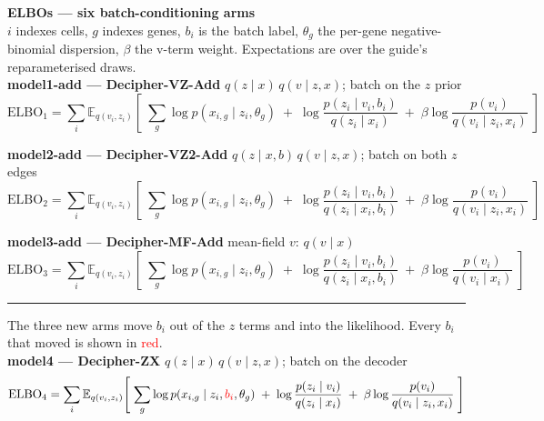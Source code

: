 \documentclass[12pt]{article}
\newcommand{\ELBO}[1]{\mathrm{ELBO}_{#1}}
\begin{document}
\textbf{\large ELBOs --- six batch-conditioning arms}\\[2pt]
{\small $i$ indexes cells, $g$ indexes genes, $b_i$ is the batch label,
$\theta_g$ the per-gene negative-binomial dispersion, $\beta$ the v-term weight.
Expectations are over the guide's reparameterised draws.}\\[10pt]

\textbf{model1-add \;---\; Decipher-VZ-Add} \hfill {\small $q(z\mid x)\,q(v\mid z,x)$; batch on the $z$ prior}
\begin{equation*}
\ELBO{1} = \sum_i \mathbb{E}_{q(v_i,z_i)}\!\left[\;
\sum_g \log p(x_{i,g}\mid z_i,\theta_g)
\;+\; \log\frac{p(z_i\mid v_i,b_i)}{q(z_i\mid x_i)}
\;+\; \beta\log\frac{p(v_i)}{q(v_i\mid z_i,x_i)}
\;\right]
\end{equation*}

\vspace{4pt}
\textbf{model2-add \;---\; Decipher-VZ2-Add} \hfill {\small $q(z\mid x,b)\,q(v\mid z,x)$; batch on both $z$ edges}
\begin{equation*}
\ELBO{2} = \sum_i \mathbb{E}_{q(v_i,z_i)}\!\left[\;
\sum_g \log p(x_{i,g}\mid z_i,\theta_g)
\;+\; \log\frac{p(z_i\mid v_i,b_i)}{q(z_i\mid x_i,b_i)}
\;+\; \beta\log\frac{p(v_i)}{q(v_i\mid z_i,x_i)}
\;\right]
\end{equation*}

\vspace{4pt}
\textbf{model3-add \;---\; Decipher-MF-Add} \hfill {\small mean-field $v$: $q(v\mid x)$}
\begin{equation*}
\ELBO{3} = \sum_i \mathbb{E}_{q(v_i,z_i)}\!\left[\;
\sum_g \log p(x_{i,g}\mid z_i,\theta_g)
\;+\; \log\frac{p(z_i\mid v_i,b_i)}{q(z_i\mid x_i,b_i)}
\;+\; \beta\log\frac{p(v_i)}{q(v_i\mid x_i)}
\;\right]
\end{equation*}

\vspace{14pt}
\hrule
\vspace{10pt}
{\small The three new arms move $b_i$ out of the $z$ terms and into the likelihood.
Every $b_i$ that moved is shown in \textcolor{red}{red}.}\\[8pt]

\textbf{model4 \;---\; Decipher-ZX} \hfill {\small $q(z\mid x)\,q(v\mid z,x)$; batch on the decoder}
\begin{equation*}
\ELBO{4} = \sum_i \mathbb{E}_{q(v_i,z_i)}\!\left[\;
\sum_g \log p(x_{i,g}\mid z_i,\textcolor{red}{b_i},\theta_g)
\;+\; \log\frac{p(z_i\mid v_i)}{q(z_i\mid x_i)}
\;+\; \beta\log\frac{p(v_i)}{q(v_i\mid z_i,x_i)}
\;\right]
\end{equation*}
\end{document}
